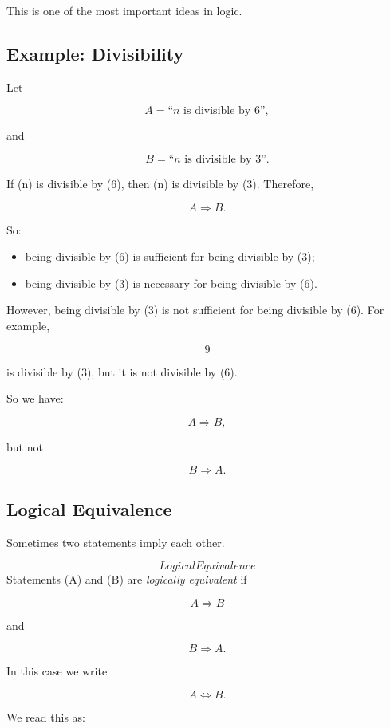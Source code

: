 This is one of the most important ideas in logic.

\subsection{Example: Divisibility}

Let

\[
A = \text{``$n$ is divisible by $6$''},
\]

and

\[
B = \text{``$n$ is divisible by $3$''}.
\]

If (n) is divisible by (6), then (n) is divisible by (3). Therefore,

\[
A \Rightarrow B.
\]

So:

\begin{itemize}
\item being divisible by (6) is sufficient for being divisible by (3);
\item being divisible by (3) is necessary for being divisible by (6).
\end{itemize}

However, being divisible by (3) is not sufficient for being divisible by (6).
For example,

\[
9
\]

is divisible by (3), but it is not divisible by (6).

So we have:

\[
A \Rightarrow B,
\]

but not

\[
B \Rightarrow A.
\]

\subsection{Logical Equivalence}

Sometimes two statements imply each other.

\begin{definition}\[Logical Equivalence\]
Statements (A) and (B) are \emph{logically equivalent} if

\[
A \Rightarrow B
\]

and

\[
B \Rightarrow A.
\]

In this case we write

\[
A \Leftrightarrow B.
\]

\end{definition}

We read this as:

